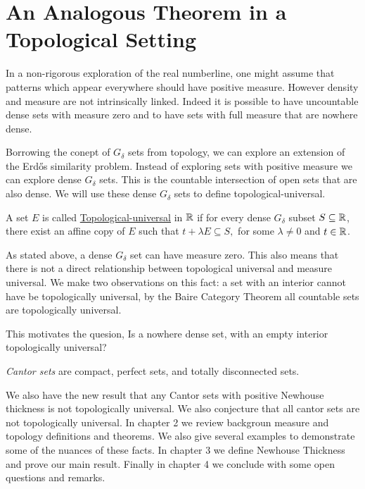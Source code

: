 \section{An Analogous Theorem in a Topological Setting}

In a non-rigorous exploration of the real numberline, one might assume that patterns which appear everywhere should have positive measure.  However density and measure are not intrinsically linked.  Indeed it is possible to have uncountable dense sets with measure zero and to have sets with full measure that are nowhere dense.  

Borrowing the conept of $G_\delta$ sets from topology, we can explore an extension of the Erd\H{o}s similarity problem.  Instead of exploring sets with positive measure we can explore dense $G_\delta$ sets.  This is the countable intersection of open sets that are also dense.  We will use these dense $G_\delta$ sets to define topological-universal. 

\begin{definition}
    A set $E$ is called \underline{Topological-universal} in $\mathbb{R}$ if for every dense $G_\delta$ subset $S \subseteq \mathbb{R}$, there exist an affine copy of $E$ such that $t+\lambda E \subseteq S,$ for some $\lambda \neq 0$ and $t \in \mathbb{R}$.  
\end{definition}

As stated above, a dense $G_\delta$ set can have measure zero.  This also means that there is not a direct relationship between topological universal and measure universal.  We make two observations on this fact: a set with an interior cannot have be topologically universal, by the Baire Category Theorem all countable sets are topologically universal.   

This motivates the quesion, Is a nowhere dense set, with an empty interior topologically universal?  

\begin{definition}[Perfect]
    
\end{definition}

\begin{definition}
    \textit{Cantor sets} are compact, perfect sets, and totally disconnected sets.      
\end{definition}


We also have the new result that any Cantor sets with positive Newhouse thickness is not topologically universal.  We also conjecture that all cantor sets are not topologically universal.   In chapter 2 we review backgroun measure and topology definitions and theorems.  We also give several examples to demonstrate some of the nuances of these facts.  In chapter 3 we define Newhouse Thickness and prove our main result.  Finally in chapter 4 we conclude with some open questions and remarks.  

